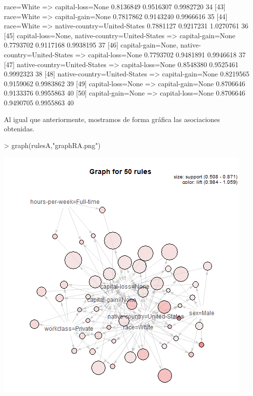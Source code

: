 \documentclass [a4paper] {article}
\begin{document}
{\begin{Schunk}
\begin{Soutput}
[42] {race=White}                   => {capital-loss=None}            0.8136849  0.9516307 0.9982720      34
[43] {race=White}                   => {capital-gain=None}            0.7817862  0.9143240 0.9966616      35
[44] {race=White}                   => {native-country=United-States} 0.7881127  0.9217231 1.0270761      36
[45] {capital-loss=None,                                                                                    
      native-country=United-States} => {capital-gain=None}            0.7793702  0.9117168 0.9938195      37
[46] {capital-gain=None,                                                                                    
      native-country=United-States} => {capital-loss=None}            0.7793702  0.9481891 0.9946618      37
[47] {native-country=United-States} => {capital-loss=None}            0.8548380  0.9525461 0.9992323      38
[48] {native-country=United-States} => {capital-gain=None}            0.8219565  0.9159062 0.9983862      39
[49] {capital-loss=None}            => {capital-gain=None}            0.8706646  0.9133376 0.9955863      40
[50] {capital-gain=None}            => {capital-loss=None}            0.8706646  0.9490705 0.9955863      40
\end{Soutput}
\end{Schunk}

\normalsize
\bigskip
Al igual que anteriormente, mostramos de forma gráfica las asociaciones obtenidas.
\begin{Schunk}
\begin{Sinput}
> graph(rulesA,"graphRA.png")
\end{Sinput}
\end{Schunk}
\includegraphics[width=\textwidth]{graphRA}

}
\end{document}
